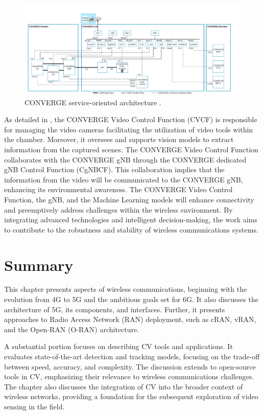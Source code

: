 \begin{figure}[H]
    \centering
    \includegraphics[width=1\linewidth]{figures/arch_converge.png}
    \caption[CONVERGE service-oriented architecture] {CONVERGE service-oriented architecture \cite{converge2023_specs}.}
    \label{fig:converge_arch}
\end{figure}

As detailed in \cite{converge2023_specs}, the CONVERGE Video Control Function (CVCF) is responsible for managing the video cameras facilitating the utilization
of video tools within the chamber. Moreover, it oversees and supports
vision models to extract information from the captured scenes. The CONVERGE Video Control Function collaborates with the CONVERGE gNB through the CONVERGE dedicated gNB Control Function (CgNBCF). This collaboration implies that the information from the video will be communicated to the CONVERGE gNB, enhancing its environmental awareness.
The CONVERGE Video Control Function, the gNB, and the Machine Learning models will
enhance connectivity and preemptively address challenges within the wireless environment.
By integrating advanced technologies and intelligent decision-making, the work
aims to contribute to the robustness and stability of wireless communications systems.


\section{Summary}\label{sec:Summary_SOA}
This chapter presents aspects of wireless communications, beginning with the evolution from 4G to 5G and the ambitious goals set for 6G. It also discusses the architecture of 5G, its components, and interfaces. Further, it presents approaches to Radio Access Network (RAN) deployment, such as cRAN, vRAN, and the Open-RAN (O-RAN) architecture.

A substantial portion focuses on describing CV tools and applications. It evaluates state-of-the-art detection and tracking models, focusing on the trade-off between speed, accuracy, and complexity. The discussion extends to open-source tools in CV, emphasizing their relevance to wireless communications challenges. The chapter also discusses the integration of CV into the broader context of wireless networks, providing a foundation for the subsequent exploration of video sensing in the field.

